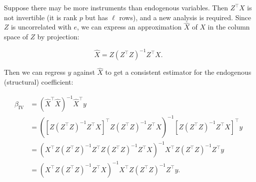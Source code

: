 Suppose there may be more instruments than endogenous variables. Then \(Z^\top X\) is not invertible (it is rank \(p\) but has \(\ell\) rows), and a new analysis is required. Since \(Z\) is uncorrelated with \(e\), we can express an approximation \(\hat{X}\) of \(X\) in the column space of \(Z\) by projection:

\[
\hat{X} = Z(Z^\top Z)^{-1}Z^\top X.
\]

Then we can regress \(y\) against \(\hat{X}\) to get a consistent estimator for the endogenous (structural) coefficient:

\begin{align}
\beta_{\text{IV}} & = \left(\hat{X}^\top \hat{X} \right)^{-1} \hat{X}^\top y \nonumber
\\ & = \left(\left[Z(Z^\top Z)^{-1}Z^\top X\right]^\top Z(Z^\top Z)^{-1}Z^\top X \right)^{-1} \left[Z(Z^\top Z)^{-1}Z^\top X\right]^\top y \nonumber
\\ & = \left( X^\top Z (Z^\top Z)^{-1} Z^\top   Z(Z^\top Z)^{-1}Z^\top X \right)^{-1} X^\top Z (Z^\top Z)^{-1} Z^\top y \nonumber
\\ & = \left(X^\top Z(Z^\top Z)^{-1} Z^\top X \right)^{-1} X^\top Z (Z^\top Z)^{-1} Z^\top y. \label{economet.2sls}
\end{align}

